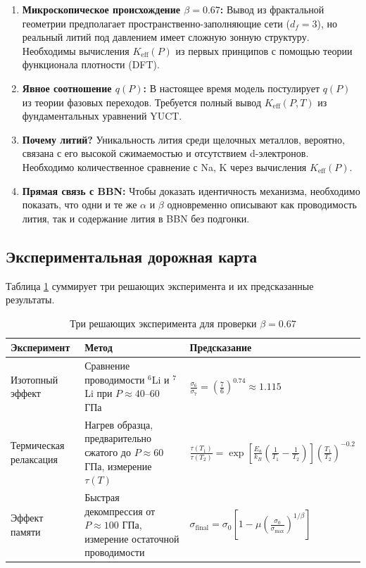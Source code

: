 \documentclass[12pt,a4paper]{article}
\theoremstyle{remark}
\newcommand{\Ke}{K_{\mathrm{eff}}}
\newcommand{\df}{d_{\!f}}
\newcommand{\alp}{\alpha}
\begin{document}
	\begin{enumerate}
		\item \textbf{Микроскопическое происхождение \(\beta = 0.67\):} Вывод из фрактальной геометрии предполагает пространственно-заполняющие сети (\(\df = 3\)), но реальный литий под давлением имеет сложную зонную структуру. Необходимы вычисления \(\Ke(P)\) из первых принципов с помощью теории функционала плотности (DFT).
		
		\item \textbf{Явное соотношение \(q(P)\):} В настоящее время модель постулирует \(q(P)\) из теории фазовых переходов. Требуется полный вывод \(\Ke(P,T)\) из фундаментальных уравнений YUCT.
		
		\item \textbf{Почему литий?} Уникальность лития среди щелочных металлов, вероятно, связана с его высокой сжимаемостью и отсутствием d-электронов. Необходимо количественное сравнение с Na, K через вычисления \(\Ke(P)\).
		
		\item \textbf{Прямая связь с BBN:} Чтобы доказать идентичность механизма, необходимо показать, что одни и те же \(\alp\) и \(\beta\) одновременно описывают как проводимость лития, так и содержание лития в BBN без подгонки.
	\end{enumerate}
	
	\subsection{Экспериментальная дорожная карта}
	
	Таблица \ref{tab:experiments} суммирует три решающих эксперимента и их предсказанные результаты.
	
	\begin{table}[h]
		\centering
		\caption{Три решающих эксперимента для проверки \(\beta = 0.67\)}
		\label{tab:experiments}
		\begin{tabular}{p{}p{}p{}}
			\toprule
			\textbf{Эксперимент} & \textbf{Метод} & \textbf{Предсказание} \\
			\midrule
			Изотопный эффект & Сравнение проводимости \(^6\)Li и \(^7\)Li при \(P \approx 40\)–60 ГПа & \(\displaystyle \frac{\sigma_6}{\sigma_7} = \left(\frac{7}{6}\right)^{0.74} \approx 1.115\) \\
			\hline
			Термическая релаксация & Нагрев образца, предварительно сжатого до \(P \approx 60\) ГПа, измерение \(\tau(T)\) & \(\displaystyle \frac{\tau(T_1)}{\tau(T_2)} = \exp\left[\frac{E_a}{k_B}\left(\frac1{T_1}-\frac1{T_2}\right)\right] \left(\frac{T_1}{T_2}\right)^{-0.2}\) \\
			\hline
			Эффект памяти & Быстрая декомпрессия от \(P \approx 100\) ГПа, измерение остаточной проводимости & \(\displaystyle \sigma_{\text{final}} = \sigma_0\left[1 - \mu\left(\frac{\sigma_0}{\sigma_{\max}}\right)^{1/\beta}\right]\) \\
			\bottomrule
		\end{tabular}
	\end{table}
	
\end{document}
